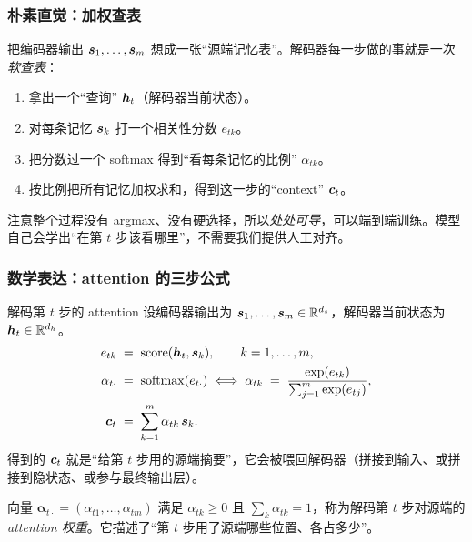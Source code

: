 \subsubsection{朴素直觉：加权查表}

\begin{intuitionblock}
把编码器输出 $\boldsymbol{s}_1,\ldots,\boldsymbol{s}_m$ 想成一张“源端记忆表”。解码器每一步做的事就是一次\emph{软查表}：
\begin{enumerate}
  \item 拿出一个“查询” $\boldsymbol{h}_t$（解码器当前状态）。
  \item 对每条记忆 $\boldsymbol{s}_k$ 打一个相关性分数 $e_{tk}$。
  \item 把分数过一个 softmax 得到“看每条记忆的比例” $\alpha_{tk}$。
  \item 按比例把所有记忆加权求和，得到这一步的“context” $\boldsymbol{c}_t$。
\end{enumerate}
注意整个过程没有 argmax、没有硬选择，所以\emph{处处可导}，可以端到端训练。模型自己会学出“在第 $t$ 步该看哪里”，不需要我们提供人工对齐。
\end{intuitionblock}

\subsubsection{数学表达：attention 的三步公式}

\begin{mathbox}{解码第 $t$ 步的 attention}
设编码器输出为 $\boldsymbol{s}_1,\ldots,\boldsymbol{s}_m \in \mathbb{R}^{d_s}$，解码器当前状态为 $\boldsymbol{h}_t \in \mathbb{R}^{d_h}$。
\begin{align}
e_{tk} &\;=\; \mathrm{score}(\boldsymbol{h}_t, \boldsymbol{s}_k), \qquad k=1,\ldots,m, \label{eq:attn-score}\\
\alpha_{t\cdot} &\;=\; \mathrm{softmax}(e_{t\cdot}) \;\Longleftrightarrow\; \alpha_{tk} \;=\; \frac{\exp(e_{tk})}{\sum_{j=1}^{m}\exp(e_{tj})}, \label{eq:attn-softmax}\\
\boldsymbol{c}_t &\;=\; \sum_{k=1}^{m} \alpha_{tk}\,\boldsymbol{s}_k. \label{eq:attn-context}
\end{align}
得到的 $\boldsymbol{c}_t$ 就是“给第 $t$ 步用的源端摘要”，它会被喂回解码器（拼接到输入、或拼接到隐状态、或参与最终输出层）。
\end{mathbox}

\begin{definition}[Attention 权重]
向量 $\boldsymbol{\alpha}_{t\cdot}=(\alpha_{t1},\ldots,\alpha_{tm})$ 满足 $\alpha_{tk}\ge 0$ 且 $\sum_k \alpha_{tk}=1$，称为解码第 $t$ 步对源端的 \emph{attention 权重}。它描述了“第 $t$ 步用了源端哪些位置、各占多少”。
\end{definition}

